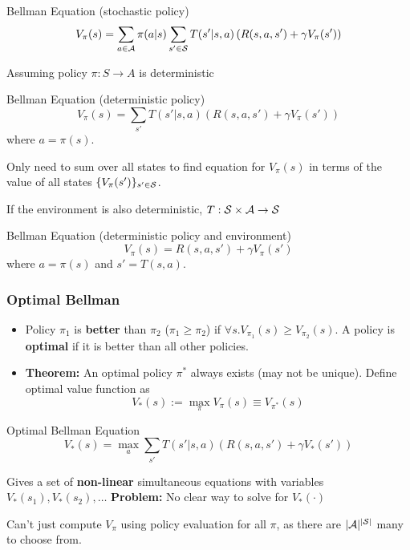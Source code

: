 \begin{frame}
\begin{block}{Bellman Equation (stochastic policy)}
	$$
	V_\pi(s) = \sum_{a \in \A} \pi(a | s) \sum_{s' \in \S} T(s' | s, a) \left( R(s,a,s') + \gamma V_\pi(s') \right) 
	$$
\end{block}

Assuming policy $\pi : S \to A$ is deterministic
\begin{block}{Bellman Equation (deterministic policy)}
	$$
	V_\pi(s) = \sum_{s'} T(s' | s, a) \left( R(s,a,s') + \gamma V_\pi(s') \right) 
	$$
	where $a = \pi(s)$.
\end{block}
\pause
Only need to sum over all states to find equation for $V_\pi(s)$ 
in terms of the value of all states $\{V_\pi(s')\}_{s' \in \S}$. 
\pause

If the environment is also deterministic, $T : \S \times \A \to \S$
\begin{block}{Bellman Equation (deterministic policy and environment)}
	$$
	V_\pi(s) = R(s,a,s') + \gamma V_\pi(s')
	$$
	where $a = \pi(s)$ and $s' = T(s,a)$.
\end{block}
\end{frame}




\begin{frame}
	\frametitle{Optimal Bellman}
	\begin{itemize}
		\item Policy $\pi_1$ is \textbf{better} than $\pi_2$ ($\pi_1 \geq \pi_2$)
		if $\forall s. V_{\pi_1}(s) \geq V_{\pi_2}(s)$. A policy is \textbf{optimal}
		if it is better than all other policies. 
		\pause
		\item \textbf{Theorem:} An optimal policy $\pi^*$ always exists (may not be unique). 
		Define optimal value function as 
		$$
		V_*(s) := \max_{\pi} V_{\pi}(s) \equiv V_{\pi^*}(s)
		$$
		\pause
	\end{itemize}

\begin{block}{Optimal Bellman Equation}
	$$
	V_*(s) = \max_a \sum_{s'} T(s' | s, a) \left( R(s,a,s') + \gamma V_*(s') \right)
	$$
\end{block}
Gives a set of \textbf{non-linear} simultaneous equations with variables
$ V_*(s_1),  V_*(s_2), \ldots$
\textbf{Problem:} No clear way to solve for $V_*(\cdot)$

Can't just compute $V_\pi$ using policy evaluation for all $\pi$, as
there are $|\A|^{|\S|}$ many to choose from.

\end{frame}

